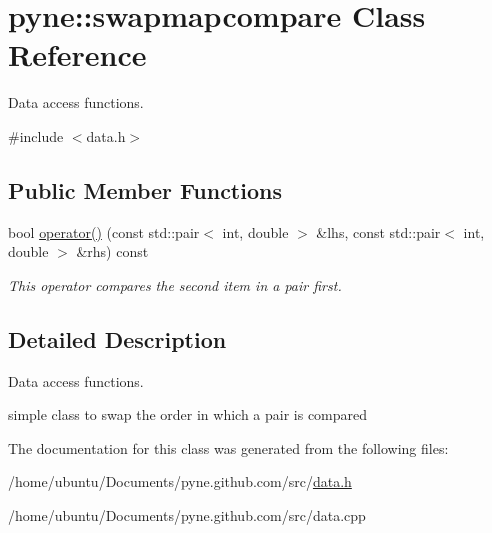 \hypertarget{classpyne_1_1swapmapcompare}{}\section{pyne\+:\+:swapmapcompare Class Reference}
\label{classpyne_1_1swapmapcompare}


Data access functions.  




{\ttfamily \#include $<$data.\+h$>$}

\subsection*{Public Member Functions}
\begin{DoxyCompactItemize}
\item 
bool \hyperlink{classpyne_1_1swapmapcompare_a766adfc375aa681d00aa60ac66a1fdd9}{operator()} (const std\+::pair$<$ int, double $>$ \&lhs, const std\+::pair$<$ int, double $>$ \&rhs) const \hypertarget{classpyne_1_1swapmapcompare_a766adfc375aa681d00aa60ac66a1fdd9}{}\label{classpyne_1_1swapmapcompare_a766adfc375aa681d00aa60ac66a1fdd9}

\begin{DoxyCompactList}\small\item\em This operator compares the second item in a pair first. \end{DoxyCompactList}\end{DoxyCompactItemize}


\subsection{Detailed Description}
Data access functions. 

simple class to swap the order in which a pair is compared 

The documentation for this class was generated from the following files\+:\begin{DoxyCompactItemize}
\item 
/home/ubuntu/\+Documents/pyne.\+github.\+com/src/\hyperlink{data_8h}{data.\+h}\item 
/home/ubuntu/\+Documents/pyne.\+github.\+com/src/data.\+cpp\end{DoxyCompactItemize}
